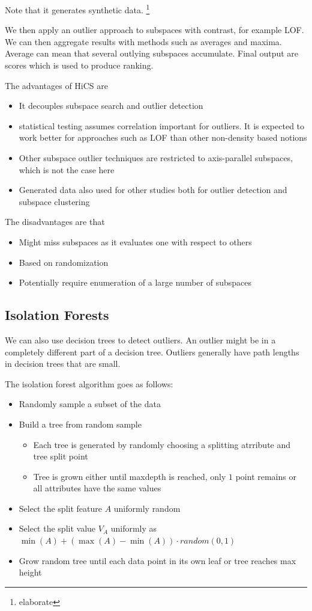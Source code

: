     Note that it generates synthetic data. \footnote{elaborate}
    
    We then apply an outlier approach to subspaces with contrast, for example LOF. We can then aggregate results with methods such as averages and maxima. Average can mean that several outlying subspaces accumulate. Final output are scores which is used to produce ranking.
    
    The advantages of HiCS are
    \begin{itemize}
        \item It decouples subspace search and outlier detection
        \item statistical testing assumes correlation important for outliers. It is expected to work better for approaches such as LOF than other non-density based notions
        \item Other subspace outlier techniques are restricted to axis-parallel subspaces, which is not the case here
        \item Generated data also used for other studies both for outlier detection and subspace clustering
    \end{itemize}
    The disadvantages are that
    \begin{itemize}
        \item Might miss subspaces as it evaluates one with respect to others
        \item Based on randomization
        \item Potentially require enumeration of a large number of subspaces
    \end{itemize}
    
    
\subsection{Isolation Forests}
    We can also use decision trees to detect outliers. An outlier might be in a completely different part of a decision tree. Outliers generally have path lengths in decision trees that are small. 
    
    The isolation forest algorithm goes as follows:
    \begin{itemize}
        \item Randomly sample a subset of the data
        \item Build a tree from random sample
            \begin{itemize}
                \item Each tree is generated by randomly choosing a splitting atrribute and tree split point
                \item Tree is grown either until maxdepth is reached, only $1$ point remains or all attributes have the same values
            \end{itemize}
        \item Select the split feature $A$ uniformly random
        \item Select the split value $V_A$ uniformly as $\min(A) + (\max(A) - \min(A)) \cdot random(0, 1)$
        \item Grow random tree until each data point in its own leaf or tree reaches max height
    \end{itemize}
    
